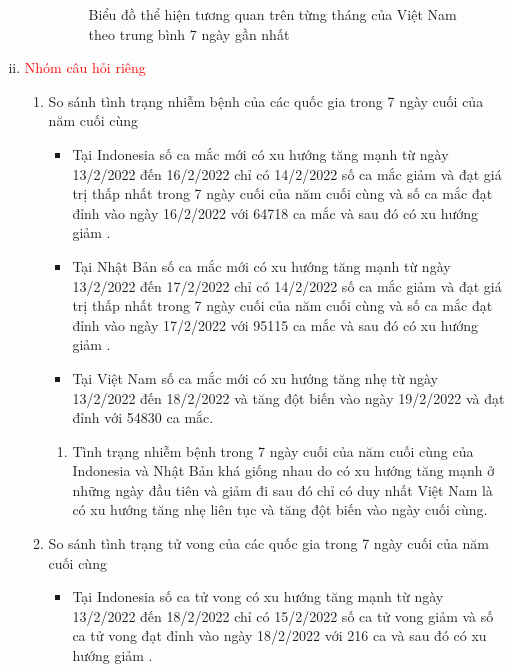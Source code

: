 \documentclass[a4paper]{article}
\theoremstyle{definition}
\begin{document}
\begin{enumerate}[i)]
\begin{enumerate}[1)]
\begin{figure}[h!]
\begin{center}
	    \label{fig:my_label}
	\end{center}
\end{figure}
\begin{figure}[h!]
    \begin{center}
	    \caption{Biểu đồ thể hiện tương quan trên từng tháng của Việt Nam theo trung bình 7 ngày gần nhất}
	\end{center}
\end{figure}
\newpage
    \end{enumerate}
\item \textcolor{red}{Nhóm câu hỏi riêng}
    \begin{enumerate}[1)]
        \item So sánh tình trạng nhiễm bệnh của các quốc gia trong 7 ngày cuối của năm cuối cùng
\begin{itemize}
	\item  Tại Indonesia số ca mắc mới có xu hướng tăng mạnh từ ngày 13/2/2022 đến 16/2/2022 chỉ có 14/2/2022 số ca mắc giảm và đạt giá trị thấp nhất trong 7 ngày cuối của năm cuối cùng và số ca mắc đạt đỉnh vào ngày 16/2/2022 với 64718 ca mắc và sau đó có xu hướng giảm .
   \item Tại Nhật Bản  số ca mắc mới có xu hướng tăng mạnh từ ngày 13/2/2022 đến 17/2/2022 chỉ có 14/2/2022 số ca mắc giảm và đạt giá trị thấp nhất trong 7 ngày cuối của năm cuối cùng và số ca mắc đạt đỉnh vào ngày 17/2/2022 với 95115 ca mắc và sau đó có xu hướng giảm .
   \item Tại Việt Nam số ca mắc mới có xu hướng tăng nhẹ từ ngày 13/2/2022 đến 18/2/2022 và tăng đột biến vào ngày 19/2/2022 và đạt đỉnh với 54830 ca mắc.
	\end{itemize}
	\begin{enumerate}[=>]
	\item Tình trạng nhiễm bệnh trong 7 ngày cuối của năm cuối cùng của Indonesia và Nhật Bản khá giống nhau do có xu hướng tăng mạnh ở những ngày đầu tiên và giảm đi sau đó chỉ có duy nhất Việt Nam là có xu hướng tăng nhẹ liên tục và tăng đột biến vào ngày cuối cùng.
	\end{enumerate}
        \item So sánh tình trạng tử vong của các quốc gia trong 7 ngày cuối của năm cuối cùng
        \begin{itemize}
	\item Tại Indonesia số ca tử vong có xu hướng tăng mạnh từ ngày 13/2/2022 đến 18/2/2022 chỉ có 15/2/2022 số ca tử vong giảm và số ca tử vong đạt đỉnh vào ngày 18/2/2022 với 216 ca và sau đó có xu hướng giảm .

\end{itemize}
\end{enumerate}
\end{enumerate}
\end{document}
